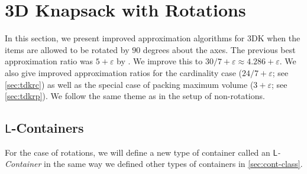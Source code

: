 \documentclass[10pt,a4paper]{amsart}
\newcommand{\eps}{\varepsilon}
\renewcommand{\epsilon}{\varepsilon} %
\newtheorem{theorem}{Theorem}[section]
\theoremstyle{definition}
\newcommand{\opt}{\mathtt{opt}}
\newcommand{\LContainer}{$\mathsf{L}$-Container}
\newcommand{\LContainers}{$\mathsf{L}$-Containers}
\newcommand{\OPT}{\mathrm{OPT}}
\begin{document}



\section{3D Knapsack with Rotations}
\label{sec:tdkr}
In this section, we present improved approximation algorithms for 3DK when the items are allowed to be rotated by $90$ degrees about the axes.
The previous best approximation ratio was $5+\eps$ by \cite{3d-knapsack}. We improve this to $30/7+\eps\approx4.286+\eps$.
We also give improved approximation ratios for the cardinality case ($24/7+\eps$; see \cref{sec:tdkrc}) as well as the special case of packing maximum volume ($3+\eps$; see \cref{sec:tdkrp}).
We follow the same theme as in the setup of non-rotations.
\subsection{\texorpdfstring{\LContainers}{L-Containers}}
\label{sec:Lcontainer}
For the case of rotations, we will define a new type of container called an \emph{\LContainer} in the same way we defined other types of containers in \cref{sec:cont-class}. 
\end{document}
